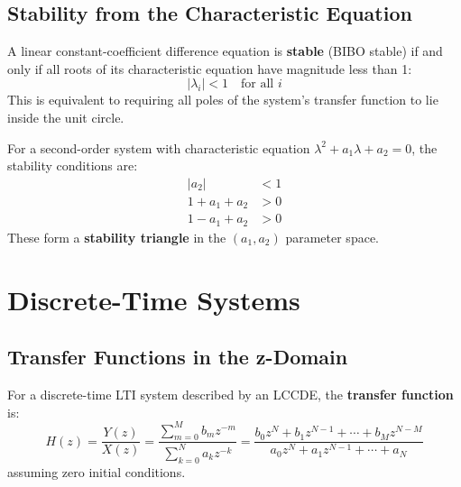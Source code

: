 \subsection{Stability from the Characteristic Equation}

\begin{keyconceptbox}[title=Stability Criterion for Difference Equations]
A linear constant-coefficient difference equation is \textbf{stable} (BIBO stable) if and only if all roots of its characteristic equation have magnitude less than 1:
\begin{equation}
|\lambda_i| < 1 \quad \text{for all } i
\end{equation}
This is equivalent to requiring all poles of the system's transfer function to lie inside the unit circle.
\end{keyconceptbox}

For a second-order system with characteristic equation $\lambda^2 + a_1\lambda + a_2 = 0$, the stability conditions are:
\begin{align}
|a_2| &< 1 \\
1 + a_1 + a_2 &> 0 \\
1 - a_1 + a_2 &> 0
\end{align}
These form a \textbf{stability triangle} in the $(a_1, a_2)$ parameter space.

\section{Discrete-Time Systems}

\subsection{Transfer Functions in the z-Domain}

\begin{definitionbox}[title=Definition: Discrete-Time Transfer Function]
For a discrete-time LTI system described by an LCCDE, the \textbf{transfer function} is:
\begin{equation}
H(z) = \frac{Y(z)}{X(z)} = \frac{\sum_{m=0}^{M} b_m z^{-m}}{\sum_{k=0}^{N} a_k z^{-k}} = \frac{b_0 z^N + b_1 z^{N-1} + \cdots + b_M z^{N-M}}{a_0 z^N + a_1 z^{N-1} + \cdots + a_N}
\end{equation}
assuming zero initial conditions.
\end{definitionbox}

